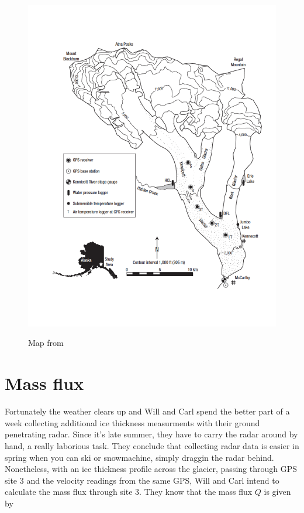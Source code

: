 \documentclass[parskip=half]{scrartcl}
\begin{document}
\begin{figure}
  \centering
   \includegraphics[width=14cm]{figures/barth-map} 
   \label{fig:map}
   \caption{Map from \cite{Bartholomaus2008}}
\end{figure}

\section{Mass flux}

Fortunately the weather clears up and Will and Carl spend the better part of a week collecting additional ice thickness measurments with their ground penetrating radar. Since it's late summer, they have to carry the radar around by hand, a really laborious task. They conclude that collecting radar data is easier in spring when you can ski or snowmachine, simply draggin the radar behind. Nonetheless, with an ice thickness profile across the glacier, passing through GPS site 3 and the velocity readings from the same GPS, Will and Carl intend to calculate the mass flux through site 3. They know that the mass flux $Q$ is given by
\end{document}
